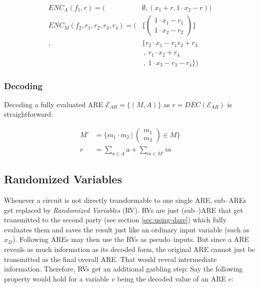 \documentclass[12pt, a4paper]{article}
\begin{document}
\begin{align*}
ENC_A(f_1, r) = \Big( & \emptyset, (x_1 + r, 1 \cdot x_2 - r)\Big) \\
ENC_M(f_2,  r_1, r_2, r_3, r_4) = \Bigg( & \bigg\{
\begin{pmatrix}1 \cdot x_1 - r_1\\1 \cdot x_2 - r_2\end{pmatrix} \bigg\}\\
,& \bigg\{r_2 \cdot x_1 -r_1r_2+r_3 \\
&\ ,\ r_1 \cdot x_2 + r_4 \\
&\ ,\ 1 \cdot x_3-r_3-r_4\bigg\} \Bigg)
\end{align*}


\subsubsection{Decoding}
\label{sec:affinization_decoding}

Decoding a fully evaluated ARE $\mathcal{E}_{AR} = \{(M,A)\}$ as $r =
DEC(\mathcal{E}_{AR})$ is
straightforward:

\begin{align}
M' &= \Bigg\{ m_1 \cdot m_2\ \Bigg|\ \begin{pmatrix}m_1\\m_2\end{pmatrix}
\in M \Bigg\} \\
r & = \sum_{a \in A} a + \sum_{m \in M'} m
\end{align}


\subsection{Randomized Variables}
\label{sec:randomized-variables}

Whenever a circuit is not directly transformable to one single ARE, sub--AREs
get replaced by \emph{Randomized Variables} (RV). RVs are just (sub--)ARE that
get transmitted to the second party (see section \ref{sec:using-dare}) which
fully evaluates them and saves the result just like an ordinary input variable
(such as $x_D$). Following AREs may then use the RVs as pseudo--inputs. But
since a ARE reveals as much information as its decoded form, the original ARE
cannot just be transmitted as the final overall ARE. That would reveal
intermediate information. Therefore, RVs get an additional garbling step: Say
the following property would hold for a variable $v$ being the decoded value of
an ARE $e$:
\end{document}

